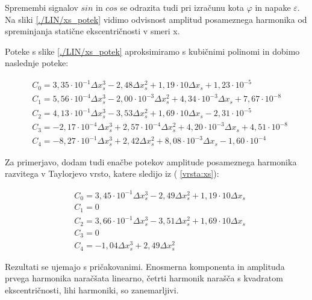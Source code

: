 \newpage
Spremembi signalov $sin$ in $cos$ se odrazita tudi pri izračunu kota $\varphi$ in napake $\varepsilon$.
Na sliki \ref{./LIN/xs_potek} vidimo odvisnost amplitud posameznega harmonika od spreminjanja statične ekscentričnosti v smeri x.


Poteke s slike \ref{./LIN/xs_potek} aproksimiramo s kubičnimi polinomi in dobimo naslednje poteke:


\begin{eqnarray}
\label{nap_lin_xs}
&C_0 =3,35\cdot 10^{-1}\Delta x_s^{3}-2,48\Delta x_s^{2}+1,19\cdot 10\Delta x_s+1,23\cdot 10^{-5} \\
&C_1 =5,56\cdot 10^{-4}\Delta x_s^{3}-2,00\cdot 10^{-3}\Delta x_s^{2}+4,34\cdot 10^{-3}\Delta x_s+7,67\cdot 10^{-8} \\
&C_2 =4,13\cdot 10^{-1}\Delta x_s^{3}-3,53\Delta x_s^{2}+1,69\cdot 10\Delta x_s-2,31\cdot 10^{-5} \\
&C_3 =-2,17\cdot 10^{-4}\Delta x_s^{3}+2,57\cdot 10^{-4}\Delta x_s^{2}+4,20\cdot 10^{-3}\Delta x_s+4,51\cdot 10^{-8} \\
&C_4 =-8,27\cdot 10^{-1}\Delta x_s^{3}+2,42\Delta x_s^{2}+8,08\cdot 10^{-3}\Delta x_s-1,60\cdot 10^{-4}
\end{eqnarray}

Za primerjavo, dodam tudi enačbe potekov amplitude posameznega harmonika razvitega v Taylorjevo vrsto, katere sledijo iz ( \ref{vrsta:xs}):

\begin{eqnarray}
&C_0 =3,45\cdot 10^{-1}\Delta x_s^{3}-2,49\Delta x_s^{2}+1,19\cdot 10\Delta x_s \\
&C_1 = 0\\
&C_2 =3,66\cdot 10^{-1}\Delta x_s^{3}-3,51\Delta x_s^{2}+1,69\cdot 10\Delta x_s\\
&C_3 = 0\\
&C_4 =-1,04\Delta x_s^{3}+2,49\Delta x_s^{2}
\end{eqnarray}

Rezultati se ujemajo s pričakovanimi. Enosmerna komponenta in amplituda prvega harmonika naračšata linearno, četrti harmonik narašča s kvadratom ekscentričnosti, lihi harmoniki, so zanemarljivi.



